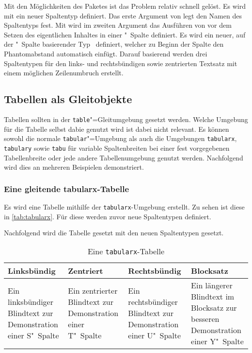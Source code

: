\documentclass[%
  english,ngerman,%
  geometry=no,DIV=12,automark,%
]{tudscrartcl}
\begin{document}
Mit den Möglichkeiten des Paketes  ist das Problem relativ 
schnell gelöst. Es wird mit  ein neuer Spaltentyp 
definiert. Das erste Argument von  legt den Namen des 
Spaltentyps fest. Mit  wird im 
zweiten Argument das Ausführen von  vor dem Setzen des 
eigentlichen Inhaltes in einer "~Spalte definiert. Es wird ein 
neuer, auf der "~Spalte basierender Typ~ definiert, welcher 
zu Beginn der Spalte den Phantomabstand automatisch einfügt. Darauf basierend 
werden drei Spaltentypen für den links- und rechtsbündigen sowie zentrierten 
Textsatz mit einem möglichen Zeilenumbruch erstellt.
%
\begin{Trunk+}
\subsection{Tabellen als Gleitobjekte}
Tabellen sollten in der \texttt{table}"=Gleitumgebung gesetzt werden. 
Welche Umgebung für die Tabelle selbst dabie genutzt wird ist dabei
nicht relevant. Es können sowohl die normale \texttt{tabular}"=Umgebung 
als auch die Umgebungen \texttt{tabularx}, \texttt{tabulary} sowie 
\texttt{tabu} für variable Spaltenbreiten bei einer fest vorgegebenen 
Tabellenbreite oder jede andere Tabellenumgebung genutzt werden. 
Nachfolgend wird dies an mehreren Beispielen demonstriert.

\subsubsection{Eine gleitende tabularx-Tabelle}
Es wird eine Tabelle mithilfe der \texttt{tabularx}-Umgebung erstellt. 
Zu sehen ist diese in \autoref{tab:tabularx}. Für diese werden zuvor 
neue Spaltentypen definiert.

\end{Trunk+}
\CodeHook{\renewcommand*{\newcolumntype}[2]{}}
\begin{Trunk*}

\end{Trunk*}
%
Nachfolgend wird die Tabelle gesetzt mit den neuen Spaltentypen gesetzt.
%
\begin{Trunk}
\begin{table}
\begin{tabularx}{\textwidth}{@{}DEFY@{}}
\toprule
\textbf{Linksbündig} & \textbf{Zentriert} & 
\textbf{Rechtsbündig} & \textbf{Blocksatz} \tabularnewline
\midrule
Ein linksbündiger Blindtext zur Demonstration einer S"~Spalte &
Ein zentrierter Blindtext zur Demonstration einer T"~Spalte &
Ein rechtsbündiger Blindtext zur Demonstration einer U"~Spalte &
Ein längerer Blindtext im Blocksatz zur besseren Demonstration
einer Y"~Spalte\tabularnewline
\bottomrule
\end{tabularx}
\caption{Eine \texttt{tabularx}-Tabelle}\label{tab:tabularx}
\end{table}

\end{Trunk}
\end{document}
